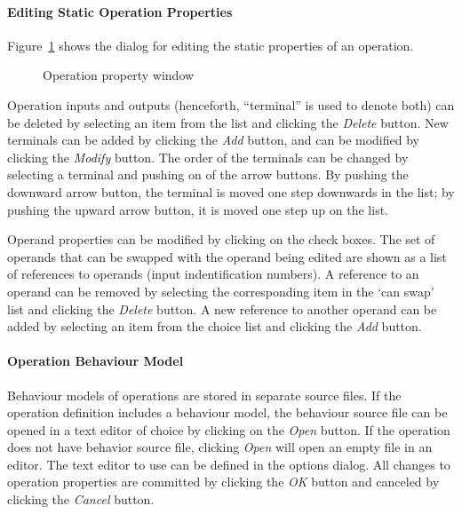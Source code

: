 \documentclass[a4paper,twoside]{tceusermanual}
\begin{document}
\paragraph{Editing Static Operation Properties}

Figure~\ref{fig:osed_operation_window} shows the dialog for editing the
static properties of an operation. 
 
\begin{figure}[tb]
\centerline{}
\caption{Operation property window}
\label{fig:osed_operation_window}
\end{figure}

Operation inputs and outputs (henceforth, ``terminal'' is used to denote both)
can be deleted by selecting an item from the list and clicking the \emph{Delete}
button. New terminals can be added
by clicking the \emph{Add} button, and can be modified by clicking the \emph{Modify}
button. The order of the terminals can be changed by selecting a terminal
and pushing on of the arrow buttons. By pushing the downward arrow button, the
terminal is moved one step downwards in the list; by pushing the upward arrow
button, it is moved one step up on the list.

Operand properties can be modified by clicking on the check boxes. The set
of operands that can be swapped with the operand being edited are shown as a
list of references to operands (input indentification numbers).  A reference
to an operand can be removed by selecting the corresponding item in the `can
swap' list and clicking the \emph{Delete} button.  A new reference to another
operand can be added by selecting an item from the choice list and clicking
the \emph{Add} button.

\paragraph{Operation Behaviour Model}

Behaviour models of operations are stored in separate source files.  If the
operation definition includes a behaviour model, the behaviour source file
can be opened in a text editor of choice by clicking on the \emph{Open}
button. If the operation does not have behavior source file, clicking
\emph{Open} will open an empty file in an editor. The text editor to use can
be defined in the options dialog. All changes to operation properties are 
committed by clicking the \emph{OK} button and canceled by clicking the \emph{Cancel} 
button.
\end{document}
